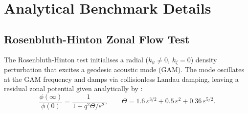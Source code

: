 \documentclass{article}
\theoremstyle{plain}
\theoremstyle{definition}
\theoremstyle{remark}
\begin{document}



\section{Analytical Benchmark Details}
\label{app:analytical_details}

\subsection{Rosenbluth-Hinton Zonal Flow Test}

The Rosenbluth-Hinton test \cite{Rosenbluth} initialises a radial ($k_\psi \neq 0$, $k_\zeta = 0$) density perturbation that excites a geodesic acoustic mode (GAM). The mode oscillates at the GAM frequency and damps via collisionless Landau damping, leaving a residual zonal potential given analytically by \cite{xiao2006plasma}:
\begin{equation}
\frac{\phi(\infty)}{\phi(0)} = \frac{1}{1 + q^2 \Theta / \varepsilon^2}, \qquad \Theta = 1.6\,\varepsilon^{3/2} + 0.5\,\varepsilon^2 + 0.36\,\varepsilon^{5/2}.
\end{equation}
\end{document}
